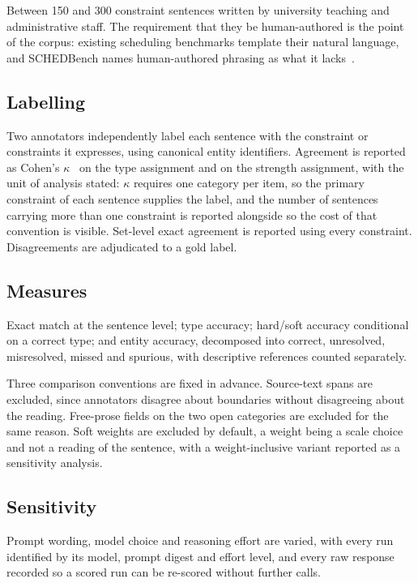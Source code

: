 \documentclass[acmsmall,screen,review,anonymous]{acmart}
\begin{document}
Between 150 and 300 constraint sentences written by university teaching and
administrative staff. The requirement that they be human-authored is the point
of the corpus: existing scheduling benchmarks template their natural language,
and SCHEDBench names human-authored phrasing as what it
lacks~\cite{sharma2026schedbench}.

\subsection{Labelling}

Two annotators independently label each sentence with the constraint or
constraints it expresses, using canonical entity identifiers. Agreement is
reported as Cohen's $\kappa$~\cite{cohen1960kappa} on the type assignment and
on the strength assignment, with the unit of analysis stated: $\kappa$ requires
one category per item, so the primary constraint of each sentence supplies the
label, and the number of sentences carrying more than one constraint is
reported alongside so the cost of that convention is visible. Set-level exact
agreement is reported using every constraint. Disagreements are adjudicated to
a gold label.

\subsection{Measures}

Exact match at the sentence level; type accuracy; hard/soft accuracy
conditional on a correct type; and entity accuracy, decomposed into correct,
unresolved, misresolved, missed and spurious, with descriptive references
counted separately.

Three comparison conventions are fixed in advance. Source-text spans are
excluded, since annotators disagree about boundaries without disagreeing about
the reading. Free-prose fields on the two open categories are excluded for the
same reason. Soft weights are excluded by default, a weight being a scale
choice and not a reading of the sentence, with a weight-inclusive variant
reported as a sensitivity analysis.

\subsection{Sensitivity}

Prompt wording, model choice and reasoning effort are varied, with every run
identified by its model, prompt digest and effort level, and every raw
response recorded so a scored run can be re-scored without further calls.
\end{document}
